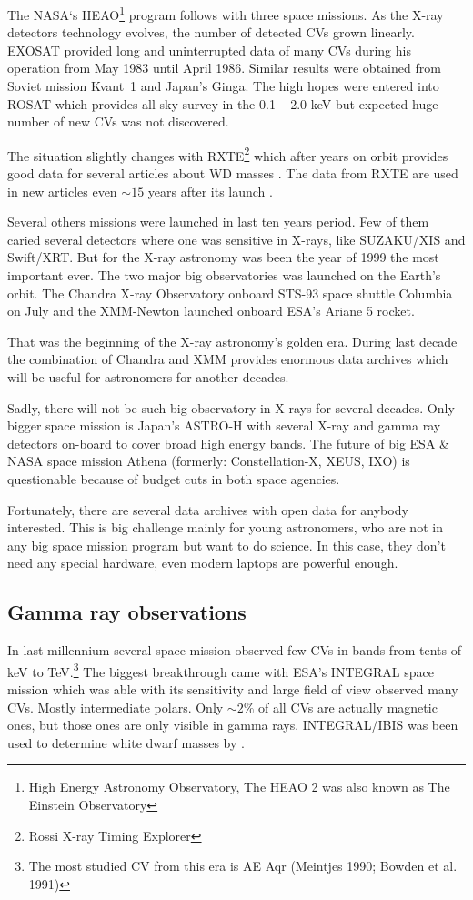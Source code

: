 \documentclass[oneside,a4paper,11pt]{report}
\begin{document}
The NASA`s HEAO\footnote{High Energy Astronomy Observatory, The HEAO 2 was also known as 
The Einstein Observatory} program follows with three space missions. As the X-ray detectors 
technology evolves, the number of detected CVs grown linearly. \mbox{EXOSAT} provided long and 
uninterrupted data of many CVs during his operation from May 1983 until April 1986. 
Similar results were obtained from Soviet mission \mbox{Kvant 1} and Japan's Ginga.
The high hopes were entered into ROSAT which provides all-sky survey in the
 0.1 – 2.0 keV but expected huge number of new CVs was not discovered. 

The situation slightly changes with RXTE\footnote{Rossi X-ray Timing Explorer} which after 
years on orbit provides good data for several articles about WD masses \citet{2005A&A...435..191S}. 
The data from RXTE are used in new articles even $\sim15$ years after its launch \citet{2011A&A...526A..77B}.
 
Several others missions were launched in last ten years period. Few of them caried several 
detectors where one was sensitive in X-rays, like SUZAKU/XIS and Swift/XRT. But for the X-ray 
astronomy was been the year of 1999 the most important ever. The two major big observatories 
was launched on the Earth's orbit. The Chandra X-ray Observatory onboard STS-93 space shuttle 
Columbia on July and the XMM-Newton launched onboard ESA's Ariane 5 rocket.

   That was the beginning of the X-ray astronomy's golden era. During last decade the combination of 
Chandra and XMM provides enormous data archives which will be useful for astronomers for another 
decades. 

Sadly, there will not be such big observatory in X-rays for several decades. Only bigger space 
mission is Japan's ASTRO-H with several X-ray and gamma ray detectors on-board to cover broad 
high energy bands. The future of big ESA \& NASA space mission Athena (formerly: Constellation-X, 
XEUS, IXO)  is questionable because of budget cuts in both space agencies. 

Fortunately, there are several data archives with open data for anybody 
interested. This is big challenge mainly for young astronomers, who are 
not in any big space mission program but want to do science. In this case, 
they don't need any special hardware, even modern laptops are powerful enough.     



    
\subsection{Gamma ray observations}
In last millennium several space mission observed few CVs in bands from tents of keV to TeV.\footnote{The most 
studied CV from this era is AE Aqr (Meintjes 1990; Bowden et al. 1991)}
The biggest breakthrough came with ESA's INTEGRAL space mission which was able with its sensitivity 
and large field of view observed many CVs. Mostly intermediate polars. Only $\sim 2\%$ 
of all CVs are actually magnetic ones, but those ones are only visible in gamma rays.
INTEGRAL/IBIS was been used to determine white dwarf masses by \citet{2009MNRAS.392..630L}.
\end{document}
